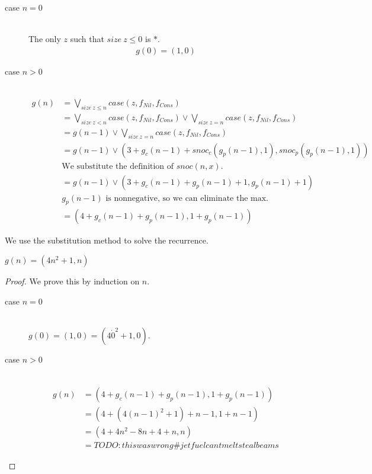 \begin{description}
  \item[case $n=0$]\hfill \\
    The only $z$ such that $size\ z \leq 0$ is $\ast$.
    \begin{align*}
      g(0) = (1, 0)
    \end{align*}
  \item[case $n>0$]\hfill \\
    \begin{align*}
      g(n) &= \bigvee\limits_{size\ z \leq n} case(z, f_{Nil}, f_{Cons}) \\
           &= \bigvee\limits_{size\ z < n} case(z, f_{Nil}, f_{Cons}) \vee \bigvee\limits_{size\ z = n} case(z, f_{Nil}, f_{Cons}) \\
           &= g(n-1) \vee \bigvee\limits_{size\ z = n} case(z, f_{Nil}, f_{Cons}) \\
           &= g(n-1) \vee (3 + g_c(n-1) + snoc_c(g_p(n-1), 1), snoc_p(g_p(n-1), 1)) \\
           &\text{We substitute the definition of $snoc(n, x)$.} \\
           &= g(n-1) \vee (3 + g_c(n-1) + g_p(n-1) + 1, g_p(n-1) + 1) \\
           &\text{$g_p(n-1)$ is nonnegative, so we can eliminate the max.} \\
           &= (4 + g_c(n-1) + g_p(n-1), 1 + g_p(n-1))
    \end{align*}
\end{description}
%
We use the substitution method to solve the recurrence.
\begin{lemma}
  $g(n) = (4n^2 + 1, n)$
\end{lemma}
\begin{proof}
  We prove this by induction on $n$.
  \begin{description}
    \item[case $n=0$]\hfill \\
      $g(0) = (1, 0) = (4\dot0^2 + 1, 0)$.
    \item[case $n>0$]\hfill \\
      \begin{align*}
        g(n) &= (4 + g_c(n-1) + g_p(n-1), 1 + g_p(n-1)) \\
             &= (4 + (4(n-1)^2 + 1) + n - 1, 1 + n - 1) \\
             &= (4 + 4n^2 - 8n + 4 + n, n) \\
             &=TODO: this was wrong \#jetfuelcantmeltstealbeams
      \end{align*}
  \end{description}
\end{proof}
